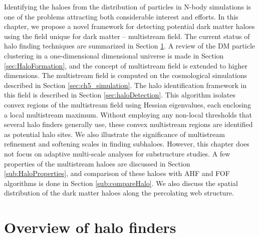 Identifying the haloes from the distribution of particles in N-body simulations is one of the problems attracting both considerable interest and efforts. In this chapter, we propose a novel framework for detecting potential dark matter haloes using the field unique for dark matter  -- multistream field. The current status of halo finding techniques are summarized in Section \ref{sec:intro}. A review of the DM particle clustering in a one-dimensional dimensional universe is made in Section \ref{sec:HaloFormation}, and the concept of multistream field is extended to higher dimensions. The multistream field is computed on the cosmological simulations described in Section \ref{sec:ch5_simulation}. The halo identification framework in this field is described in Section \ref{sec:haloDetection}. This algorithm isolates convex regions of the multistream field using Hessian eigenvalues, each enclosing a local multistream maximum. Without employing any non-local thresholds that several halo finders generally use, these convex multistream regions are identified as potential halo sites. We also illustrate the significance of multistream refinement and softening scales in finding subhaloes. However, this chapter does not focus on adaptive multi-scale analyses for substructure studies. A few properties of the multistream haloes are discussed in Section \ref{sub:HaloProperties}, and comparison of these haloes with AHF and FOF algorithms is done in Section \ref{sub:compareHalo}. We also discuss the spatial distribution of the dark matter haloes along the percolating web structure.


\section{Overview of halo finders} 
\label{sec:intro}

